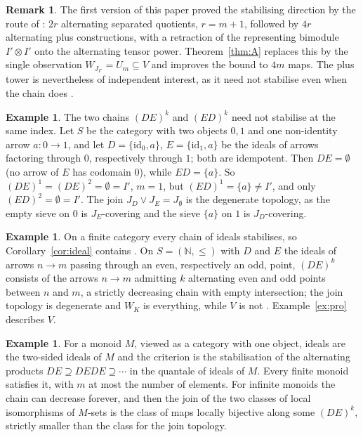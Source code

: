 \documentclass[11pt]{amsart}
\theoremstyle{definition}
\newtheorem{rem}[thm]{Remark}
\newtheorem{ex}[thm]{Example}
\begin{document}
\begin{rem}
The first version of this paper proved the stabilising direction by the
route of \cite{Finitejoin}: $2r$ alternating separated quotients, $r=m+1$,
followed by $4r$ alternating plus constructions, with a retraction of the
representing bimodule $I'\otimes I'$ onto the alternating tensor power.
Theorem~\ref{thm:A} replaces this by the single observation
$W_{J_{I'}}=U_m\subseteq V$ and improves the bound to $4m$ maps. The plus
tower is nevertheless of independent interest, as it need not stabilise even
when the chain does \cite[\S7]{Finitejoin}.
\end{rem}

\begin{ex}\label{ex:ED}
The two chains $(DE)^k$ and $(ED)^k$ need not stabilise at the same index.
Let $S$ be the category with two objects $0,1$ and one non-identity arrow
$a\colon0\to1$, and let $D=\{\mathrm{id}_0,a\}$, $E=\{\mathrm{id}_1,a\}$ be the
ideals of arrows factoring through $0$, respectively through $1$; both are
idempotent. Then $DE=\emptyset$ (no arrow of $E$ has codomain $0$), while
$ED=\{a\}$. So $(DE)^1=(DE)^2=\emptyset=I'$, $m=1$, but $(ED)^1=\{a\}\ne I'$,
and only $(ED)^2=\emptyset=I'$. The join $J_D\vee J_E=J_\emptyset$ is the
degenerate topology, as the empty sieve on $0$ is $J_E$-covering and the
sieve $\{a\}$ on $1$ is $J_D$-covering.
\end{ex}

\begin{ex}\label{ex:N}
On a finite category every chain of ideals stabilises, so
Corollary~\ref{cor:ideal} contains \cite[Thm.~1.1]{Finitejoin}. On
$S=(\mathbb N,\le)$ with $D$ and $E$ the ideals of arrows $n\to m$ passing
through an even, respectively an odd, point, $(DE)^k$ consists of the arrows
$n\to m$ admitting $k$ alternating even and odd points between $n$ and $m$,
a strictly decreasing chain with empty intersection; the join topology is
degenerate and $W_K$ is everything, while $V$ is not \cite[Thm.~7.1]{Topjoin}.
Example~\ref{ex:pro} describes $V$.
\end{ex}

\begin{ex}
For a monoid $M$, viewed as a category with one object, ideals are the
two-sided ideals of $M$ and the criterion is the stabilisation of the
alternating products $DE\supseteq DEDE\supseteq\cdots$ in the quantale of
ideals of $M$. Every finite monoid satisfies it, with $m$ at most the number
of elements. For infinite monoids the chain can decrease forever, and then
the join of the two classes of local isomorphisms of $M$-sets is the class
of maps locally bijective along some $(DE)^k$, strictly smaller than the
class for the join topology.
\end{ex}
\end{document}
